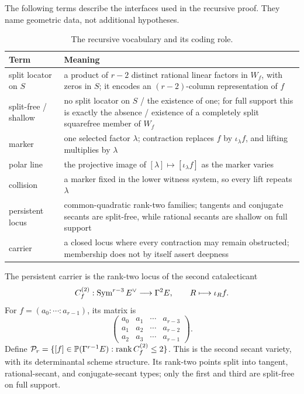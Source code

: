 The following terms describe the interfaces used in the recursive proof.
They name geometric data, not additional hypotheses.
\begin{table}[ht]
\centering
\small
\caption{The recursive vocabulary and its coding role.}
\label{tab:recursive-vocabulary}
\begin{tabular}{p{}p{}}
\toprule
Term & Meaning\\
\midrule
split locator on \(S\) & a product of \(r-2\) distinct rational linear
factors in \(W_f\), with zeros in \(S\); it encodes an \((r-2)\)-column
representation of \(f\)\\
split-free / shallow & no split locator on \(S\) / the existence of one; for
full support this is exactly the absence / existence of a completely split
squarefree member of \(W_f\)\\
marker & one selected factor \(\lambda\); contraction replaces \(f\) by
\(\iota_\lambda f\), and lifting multiplies by \(\lambda\)\\
polar line & the projective image of
\([\lambda]\mapsto[\iota_\lambda f]\) as the marker varies\\
collision & a marker fixed in the lower witness system, so every lift repeats
\(\lambda\)\\
persistent locus & common-quadratic rank-two families; tangents and conjugate
secants are split-free, while rational secants are shallow on full support\\
carrier & a closed locus where every contraction may remain obstructed;
membership does not by itself assert deepness\\
\bottomrule
\end{tabular}
\end{table}

The persistent carrier is the rank-two locus of the second catalecticant
\[
 C_f^{(2)}:\operatorname{Sym}^{r-3}E^\vee\longrightarrow\Gamma^2E,
 \qquad R\longmapsto\iota_Rf .
\]
For \(f=(a_0:\cdots:a_{r-1})\), its matrix is
\[
 \begin{pmatrix}
 a_0&a_1&\cdots&a_{r-3}\\
 a_1&a_2&\cdots&a_{r-2}\\
 a_2&a_3&\cdots&a_{r-1}
 \end{pmatrix}.
\]
Define
\(\mathcal P_r=\{[f]\in\mathbb P(\Gamma^{r-1}E):
\operatorname{rank}C_f^{(2)}\leq2\}\).
This is the second secant variety, with its determinantal scheme structure.
Its rank-two points split into tangent, rational-secant, and
conjugate-secant types; only the first and third are split-free on full
support.


